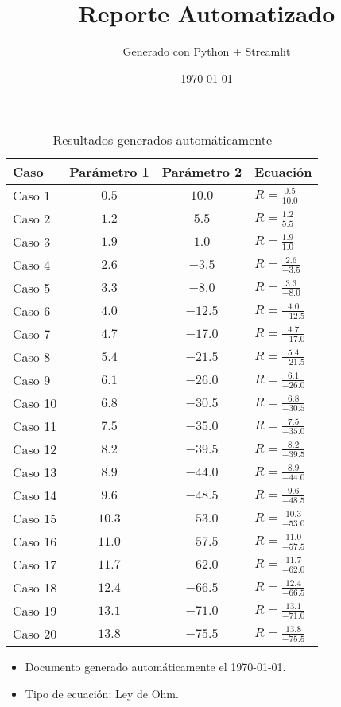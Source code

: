 \documentclass[12pt]{article}
\title{Reporte Automatizado}
\author{Generado con Python + Streamlit}
\date{\today}
\begin{document}
\maketitle

\begin{table}[h]
\centering
\caption{Resultados generados automáticamente}
\begin{tabular}{l c c >{\centering\arraybackslash}p{5cm}}
\toprule
\textbf{Caso} & \textbf{Parámetro 1} & \textbf{Parámetro 2} & \textbf{Ecuación} \\
\midrule
Caso 1 & $0.5$ & $10.0$ & $\boxed{R = \frac{0.5}{10.0}}$ \\
Caso 2 & $1.2$ & $5.5$ & $\boxed{R = \frac{1.2}{5.5}}$ \\
Caso 3 & $1.9$ & $1.0$ & $\boxed{R = \frac{1.9}{1.0}}$ \\
Caso 4 & $2.6$ & $-3.5$ & $\boxed{R = \frac{2.6}{-3.5}}$ \\
Caso 5 & $3.3$ & $-8.0$ & $\boxed{R = \frac{3.3}{-8.0}}$ \\
Caso 6 & $4.0$ & $-12.5$ & $\boxed{R = \frac{4.0}{-12.5}}$ \\
Caso 7 & $4.7$ & $-17.0$ & $\boxed{R = \frac{4.7}{-17.0}}$ \\
Caso 8 & $5.4$ & $-21.5$ & $\boxed{R = \frac{5.4}{-21.5}}$ \\
Caso 9 & $6.1$ & $-26.0$ & $\boxed{R = \frac{6.1}{-26.0}}$ \\
Caso 10 & $6.8$ & $-30.5$ & $\boxed{R = \frac{6.8}{-30.5}}$ \\
Caso 11 & $7.5$ & $-35.0$ & $\boxed{R = \frac{7.5}{-35.0}}$ \\
Caso 12 & $8.2$ & $-39.5$ & $\boxed{R = \frac{8.2}{-39.5}}$ \\
Caso 13 & $8.9$ & $-44.0$ & $\boxed{R = \frac{8.9}{-44.0}}$ \\
Caso 14 & $9.6$ & $-48.5$ & $\boxed{R = \frac{9.6}{-48.5}}$ \\
Caso 15 & $10.3$ & $-53.0$ & $\boxed{R = \frac{10.3}{-53.0}}$ \\
Caso 16 & $11.0$ & $-57.5$ & $\boxed{R = \frac{11.0}{-57.5}}$ \\
Caso 17 & $11.7$ & $-62.0$ & $\boxed{R = \frac{11.7}{-62.0}}$ \\
Caso 18 & $12.4$ & $-66.5$ & $\boxed{R = \frac{12.4}{-66.5}}$ \\
Caso 19 & $13.1$ & $-71.0$ & $\boxed{R = \frac{13.1}{-71.0}}$ \\
Caso 20 & $13.8$ & $-75.5$ & $\boxed{R = \frac{13.8}{-75.5}}$ \\
\bottomrule
\end{tabular}
\end{table}

\begin{itemize}
\item Documento generado automáticamente el \today.
\item Tipo de ecuación: Ley de Ohm.
\end{itemize}
\end{document}
